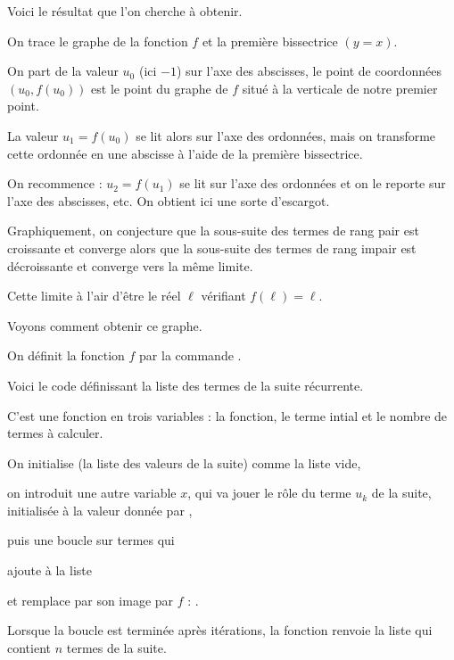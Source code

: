 Voici le résultat que l'on cherche à obtenir.

On trace le graphe de la fonction $f$ et la première bissectrice $(y=x)$.

On part de la valeur $u_0$ (ici $-1$) sur l'axe des abscisses, 
le point de coordonnées $(u_0,f(u_0))$ est le point du graphe de $f$ situé à la verticale de notre premier point.

La valeur $u_1=f(u_0)$ se lit alors 
sur l'axe des ordonnées, mais on transforme cette ordonnée 
 en une abscisse à l'aide de la première bissectrice.

On recommence : $u_2=f(u_1)$ se lit sur l'axe des ordonnées et on le reporte sur l'axe des abscisses, etc.
On obtient ici une sorte d'escargot.


Graphiquement, on conjecture que 
la sous-suite des termes de rang pair est croissante et converge
alors que la sous-suite des termes de rang impair est décroissante et 
converge vers la même limite.


Cette limite à l'air d'être le réel $\ell$ vérifiant $f(\ell)=\ell$.




\diapo

Voyons comment obtenir ce graphe.

On définit la fonction $f$ par la commande .

Voici le code définissant la liste des termes de la suite récurrente.

\change

C'est une fonction  en trois variables : la fonction, le terme intial et le nombre de termes à calculer.

On initialise  (la liste des valeurs de la suite) comme la liste vide,

on introduit une autre variable $x$, qui va jouer le rôle du terme $u_k$ de la suite, 
initialisée à la valeur donnée par ,

puis une boucle sur  termes qui 

ajoute  à la liste 

et remplace  par son image par $f$ : .

Lorsque la boucle est terminée après  itérations, la fonction renvoie la liste qui contient $n$ termes de la suite.

\change


